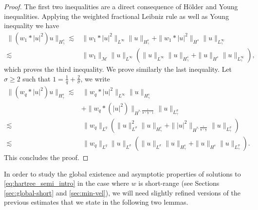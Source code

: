 \documentclass[12pt]{article}
\theoremstyle{plain}
\newcommand{\meas}{\mathcal{M}}
\begin{document}
\begin{proof}
The first two inequalities are a direct consequence of H\"older and Young inequalities. 
Applying the weighted fractional Leibniz rule as well as Young inequality we have 
\begin{align*}
    \|(w_1*|u|^2)u \|_{H^{s}_\gamma} \lesssim & \|w_1 *|u|^2\|_{L^\infty} \| u \|_{H^{s}_\gamma} + \|w_1*|u|^2\|_{H^s} \| u \|_{L^\infty_\gamma}\\
\lesssim & \|w_1\|_{\meas} \|u\|_{L^\infty} (\|u\|_{L^\infty}  \|u \|_{H^s_\gamma}  + \|u\|_{H^s}\|u \|_{L_\gamma^\infty}),
\end{align*}
which proves the third inequality. 
  We prove similarly the last inequality. Let $\sigma\ge 2$ such that $1 = \frac{1}{q}+ \frac{2}{\sigma}$, we write
    \begin{align*}
        \|(w_q*|u|^2)u \|_{H_\gamma^{s}} \lesssim & \, \|w_q*|u|^2\|_{L^{\infty} }\| u \|_{H_\gamma^s}\\
        &+ \|w_q* (|u|^2)\|_{H^{s,\frac{1}{\frac{1}{\sigma} + \frac{1}{q} - \frac12}}} \|u \|_{L_\gamma^{\sigma}}\\
        \lesssim & \, \|w_q\|_{L^q} (\|u\|^2_{L^{\sigma}} \| u \|_{H^s_\gamma}+ \| |u|^2\|_{H^{s,\frac{1}{\frac{1}{\sigma} + \frac12}}} \| u \|_{L_\gamma^{\sigma}})\\
        \lesssim & \,\|w_q\|_{L^q} \|u\|_{L^{\sigma}} (\|u\|_{L^{\sigma}}\| u \|_{H_\gamma^s} + \|u \|_{H^s}\| u \|_{L_\gamma^{\sigma}}).
    \end{align*}
This concludes the proof.
\end{proof}

In order to study the global existence and asymptotic properties of solutions to \eqref{eq:hartree_semi_intro} in the case where $w$ is short-range (see Sections \ref{sec:global-short} and \ref{sec:min-vel}), we will need slightly refined versions of the previous estimates that we state in the following two lemmas.
\end{document}
